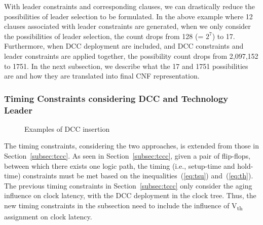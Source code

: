 With leader constraints and corresponding clauses, we can drastically reduce the possibilities of leader selection to be formulated. In the above example where 12 clauses associated with leader constraints are generated, when we only consider the possibilities of leader selection, the count drops from 128 (= $2^7$) to 17. Furthermore, when DCC deployment are included, and DCC constraints and leader constraints are applied together, the possibility count drops from 2,097,152 to 1751. In the next subsection, we describe what the 17 and 1751 possibilities are and how they are translated into final CNF representation.

\subsubsection{Timing Constraints considering DCC and Technology Leader}
\label{sec:TVA:timingconstraint}
\begin{figure*}
    \centering
    \hspace{1cm}
    \caption{Examples of DCC insertion}
    \label{fig:dccleaderinsert}
\end{figure*}
The timing constraints, considering the two approaches, is extended from those in Section~\ref{subsec:tccc}. As seen in Section~\ref{subsec:tccc}, given a pair of flip-flops, between which there exists one logic path, the timing (i.e., setup-time and hold-time) constraints must be met based on the inequalities~(\ref{eq:tsu}) and~(\ref{eq:th}). The previous timing constraints in Section~\ref{subsec:tccc} only consider the aging influence on clock latency, with the DCC deployment in the clock tree. Thus, the new timing constraints in the subsection need to include the influence of V\textsubscript{th} assignment on clock latency. 

